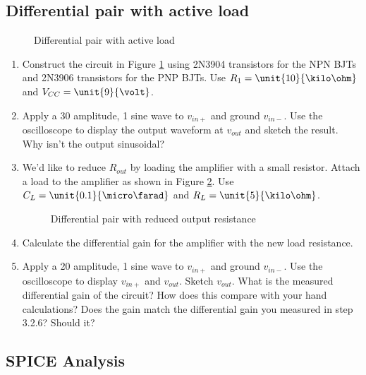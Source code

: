 \documentclass{article}
\begin{document}
\subsection{Differential pair with active load}

\begin{figure}[!htb]
  
  \centerline{\box\graph}
  \caption{Differential pair with active load}
  \label{activediff}
\end{figure}

\begin{enumerate}
  \item Construct the circuit in Figure \ref{activediff} using 2N3904 transistors for the NPN BJTs and 2N3906 transistors for the PNP BJTs. Use $R_1 = \unit{10}{\kilo\ohm}$ and $V_{CC}=\unit{9}{\volt}$.
  \item Apply a \unit{30}{\milli\volt} amplitude, \unit{1}{\kilo\hertz} sine wave to $v_{in+}$ and ground $v_{in-}$. Use the oscilloscope to display the output waveform at $v_{out}$ and sketch the result. Why isn't the output sinusoidal?
  \item We'd like to reduce $R_{out}$ by loading the amplifier with a small resistor. Attach a load to the amplifier as shown in Figure \ref{activediffload}. Use $C_L = \unit{0.1}{\micro\farad}$ and $R_L = \unit{5}{\kilo\ohm}$.

    \begin{figure}[!htb]
      
      \centerline{\box\graph}
      \caption{Differential pair with reduced output resistance}
      \label{activediffload}
    \end{figure}

  \item Calculate the differential gain for the amplifier with the new load resistance.
  \item Apply a \unit{20}{\milli\volt} amplitude, \unit{1}{\kilo\hertz} sine wave to $v_{in+}$ and ground $v_{in-}$. Use the oscilloscope to display $v_{in+}$ and $v_{out}$. Sketch $v_{out}$. What is the measured differential gain of the circuit? How does this compare with your hand calculations? Does the gain match the differential gain you measured in step 3.2.6? Should it?
\end{enumerate}

\subsection{SPICE Analysis}
\end{document}
